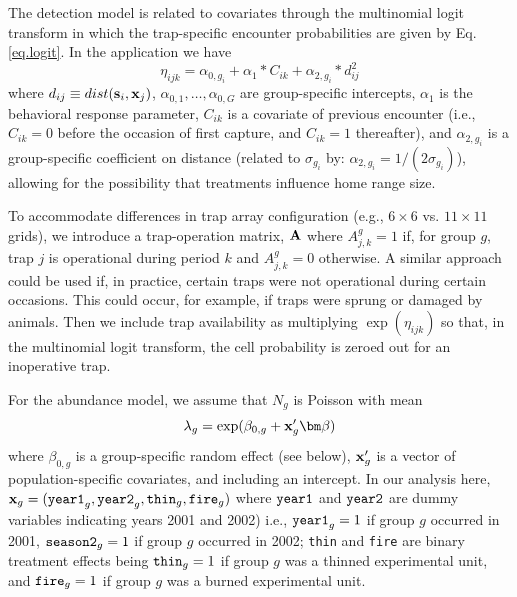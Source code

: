 The detection model is related to covariates through the multinomial
logit transform in which the trap-specific encounter probabilities are
given by Eq. \ref{eq.logit}.  In the application we have
\[
\eta_{ijk}=\alpha_{0,g_{i}} + \alpha_{1}*C_{ik}+\alpha_{2,g_{i}}*d_{ij}^{2} 
\]
where $d_{ij} \equiv dist({\bf s}_{i},{\bf x}_{j})$,
$\alpha_{0,1},\ldots, \alpha_{0,G}$ are group-specific intercepts,
$\alpha_{1}$ is the behavioral response parameter, $C_{ik}$ is a
covariate of previous encounter (i.e., $C_{ik} = 0$ before the
occasion of first capture, and $C_{ik} = 1$ thereafter), and
$\alpha_{2,g_{i}}$ is a group-specific coefficient on distance
(related to $\sigma_{g_{i}}$ by: $\alpha_{2,g_{i}} =
1/(2\sigma_{g_{i}})$), allowing for the possibility that treatments
influence home range size.

To accommodate differences in trap array configuration (e.g., $6
\times 6$ vs. $11 \times 11$ grids), we introduce a trap-operation
matrix, ${\bf A}$ where $A^{g}_{j,k}=1$ if, for group $g$, trap $j$ is
operational during period $k$ and $A^{g}_{j,k} = 0$ otherwise. A
similar approach could be used if, in practice, certain traps were not
operational during certain occasions. This could occur, for example,
if traps were sprung or damaged by animals.  Then we include trap
availability as multiplying $\exp(\eta_{ijk})$ so that, in the
multinomial logit transform, the cell probability is zeroed out for an
inoperative trap.

For the abundance model, we assume that $N_{g}$ is Poisson with mean
\[
\lambda_{g} = \exp( \beta_{0,g} +  {\bf x}'_{g} {\bm \beta} )
\]
where $\beta_{0,g}$ is a group-specific random effect (see below),
 ${\bf x}'_{g}$ is a vector of population-specific covariates,
and including an intercept.  In our analysis here, ${\bf x}_{g} = 
(\mbox{\tt year1}_{g}, \mbox{\tt year2}_{g}, \mbox{\tt thin}_{g},
\mbox{\tt fire}_{g})$ where $\mbox{\tt year1}$ and $\mbox{\tt year2}$
are dummy variables indicating years 2001 and 2002) i.e., $\mbox{\tt
  year1}_{g} = 1$ if group $g$ occurred in 2001, $\mbox{\tt
  season2}_{g} = 1$ if group $g$ occurred in 2002; \mbox{\tt thin} and
\mbox{\tt fire}
are binary treatment effects being $\mbox{\tt thin}_{g}=1$ if group $g$ was a
thinned experimental unit, and $\mbox{\tt fire}_{g} = 1$ if group $g$ was a
burned experimental unit.

